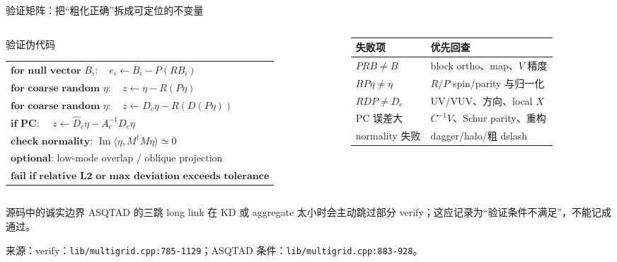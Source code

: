 \documentclass[UTF8,aspectratio=169,11pt]{ctexbeamer}
\newcommand{\source}[1]{\vspace{0.04em}\par\noindent\parbox[t]{0.96\linewidth}{\raggedright\tiny\color{muted}来源：#1\par}}
\newcommand{\codepath}[1]{\nolinkurl{#1}}
\begin{document}
\begin{frame}[t]{验证矩阵：把“粗化正确”拆成可定位的不变量}
  \footnotesize
  \begin{columns}[T,totalwidth=\textwidth]
    \begin{column}{0.62\textwidth}
      \begin{block}{验证伪代码}
        \begin{tabular}{@{}l@{}}
          $\textbf{for null vector }B_i:\quad e_i\leftarrow B_i-P(RB_i)$ \\
          $\textbf{for coarse random }\eta:\quad z\leftarrow\eta-R(P\eta)$ \\
          $\textbf{for coarse random }\eta:\quad
             z\leftarrow D_c\eta-R(D(P\eta))$ \\
          $\textbf{if PC: }\quad z\leftarrow \widehat D_c\eta-A_c^{-1}D_c\eta$ \\
          $\textbf{check normality: }\operatorname{Im}\langle\eta,M^\dagger M\eta\rangle\simeq0$ \\
          $\textbf{optional: }\text{low-mode overlap / oblique projection}$ \\
          $\textbf{fail if relative L2 or max deviation exceeds tolerance}$
        \end{tabular}
      \end{block}
    \end{column}
    \begin{column}{0.34\textwidth}
      \begin{tabularx}{\linewidth}{@{}lX@{}}
        \toprule
        失败项 & 优先回查 \\
        \midrule
        $PRB\neq B$ & block ortho、map、$V$ 精度 \\
        $RP\eta\neq\eta$ & $R/P$ spin/parity 与归一化 \\
        $RDP\neq D_c$ & UV/VUV、方向、local $X$ \\
        PC 误差大 & $C^{-1}V$、Schur parity、重构 \\
        normality 失败 & dagger/halo/粗 dslash \\
        \bottomrule
      \end{tabularx}
    \end{column}
  \end{columns}
  \vspace{0.08cm}
  \begin{alertblock}{源码中的诚实边界}
    ASQTAD 的三跳 long link 在 KD 或 aggregate 太小时会主动跳过部分 verify；这应记录为“验证条件不满足”，不能记成通过。
  \end{alertblock}
  \source{verify：\codepath{lib/multigrid.cpp:785-1129}；ASQTAD 条件：\codepath{lib/multigrid.cpp:883-928}。}
\end{frame}
\end{document}
